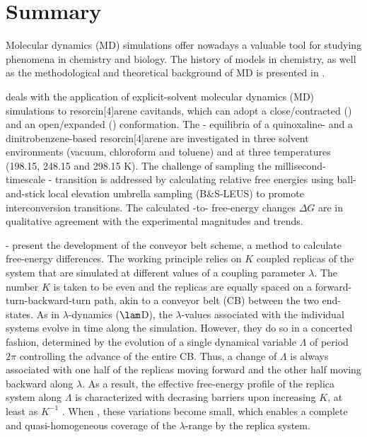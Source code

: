 \chapter{Summary}

Molecular dynamics (MD) simulations offer nowadays a valuable 
tool for studying phenomena in chemistry and biology.
%
The history of models in chemistry, as well as the methodological 
and theoretical background of MD is presented in .

 deals with the application of explicit-solvent molecular dynamics (MD)
simulations to resorcin[4]arene cavitands, which
can adopt a close/contracted (\vase{})
and an open/expanded (\kite{}) conformation.
%
The \vase-\kite{} equilibria of a quinoxaline- and a dinitrobenzene-based 
resorcin[4]arene are investigated in three solvent environments (vacuum, chloroform and toluene)
and at three temperatures (198.15, 248.15 and 298.15 K).
%
The challenge of sampling the millisecond-timescale \vase-\kite{} transition
%
is addressed by calculating relative free energies using ball-and-stick local 
elevation umbrella sampling (B\&S-LEUS) to promote interconversion transitions.
%
The calculated \vase-to-\kite{} free-energy changes $\Delta G$
are in qualitative agreement with the 
experimental magnitudes and trends.
%


- present the development of the conveyor belt scheme,
a method to calculate free-energy differences.
%
The working principle relies on $K$ coupled replicas of the system that are 
simulated at different values of a coupling parameter $\lambda$.
%
The number $K$ is taken to be even and the replicas are equally spaced
on a forward-turn-backward-turn path, akin to a conveyor belt (CB)
between the two end-states.
%
As in $\lambda$-dynamics ($\lam$D), the $\lambda$-values associated with the 
individual systems evolve in time along the simulation.
%
However, they do so in a concerted fashion, determined by the evolution
of a single dynamical variable $\Lambda$ of period $2\pi$ controlling 
the advance of the entire CB.
%
Thus, a change of $\Lambda$ is always
associated with one half of the replicas moving forward and the other half moving backward along $\lambda$.
%
As a result, the effective free-energy profile of the 
replica system along $\Lambda$ is characterized with 
decrasing barriers upon increasing $K$, at least as $K^{-1}$ .
%
When , 
these variations become small, 
which enables a complete and quasi-homogeneous coverage of the $\lambda$-range
by the replica system.
%


